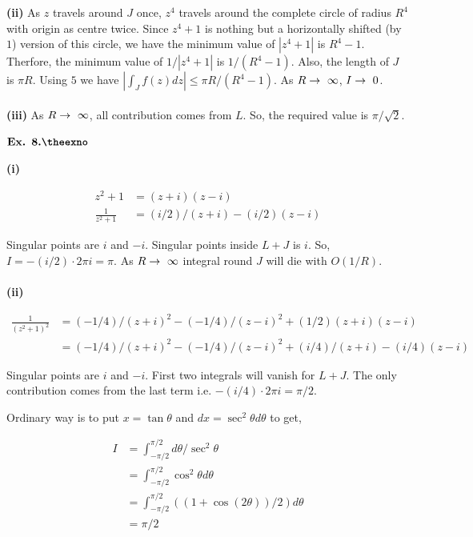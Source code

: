 \documentclass{article}
\def\tf{\textbf}
\def\rto{\ensuremath\rightarrow\ }
\newcounter{exno}
\begin{document}
\tf{(ii)} As $z$ travels around $J$ once, $z^4$ travels around the complete circle of radius $R^4$ with origin as centre twice. Since $z^4+1$ is nothing but a horizontally shifted (by $1$) version of this circle, we have the minimum value of $|z^4+1|$ is $R^4-1$. Therfore, the minimum value of $1/|z^4+1|$ is $1/(R^4-1)$. Also, the length of $J$ is $\pi R$. Using $5$ we have $|\int_{J}f(z)dz| \leq \pi R/(R^4-1)$. As $R \rto \infty$, $I \rto 0$.\\~\\ 

\tf{(iii)} As $R \rto \infty$, all contribution comes from $L$. So, the required value is $\pi/\sqrt{2}$.

\vspace{0.2in}

${\textbf{Ex. 8.\theexno}}$\addtocounter{exno}{1}
\tf{(i)}

\begin{align*}
    z^2+1 &= (z+i)(z-i)\\
    \frac{1}{z^2+1} &= (i/2)/(z+i) - (i/2)(z-i)
\end{align*}

Singular points are $i$ and $-i$. Singular points inside $L+J$ is $i$. So, $I = -(i/2) \cdot 2\pi i = \pi$. As $R\rto \infty$ integral round $J$ will die with $O(1/R)$.\\~\\

\tf{(ii)}

\begin{align*}
    \frac{1}{(z^2+1)^2} &= (-1/4)/(z+i)^2 - (-1/4)/(z-i)^2 + (1/2)(z+i)(z-i)\\
    &= (-1/4)/(z+i)^2 - (-1/4)/(z-i)^2 + (i/4)/(z+i) - (i/4)(z-i)
\end{align*}

Singular points are $i$ and $-i$. First two integrals will vanish for $L+J$. The only contribution comes from the last term i.e. $-(i/4) \cdot 2\pi i = \pi/2$.

Ordinary way is to put $x=\tan \theta$ and $dx = \sec^2\theta d\theta$ to get, 

\begin{align*}
    I &= \int_{-\pi/2}^{\pi/2}d\theta/\sec^2\theta\\
    &= \int_{-\pi/2}^{\pi/2}\cos^2\theta d\theta\\
    &= \int_{-\pi/2}^{\pi/2}((1+\cos(2\theta))/2)d\theta\\
    &= \pi/2
\end{align*}
\end{document}
